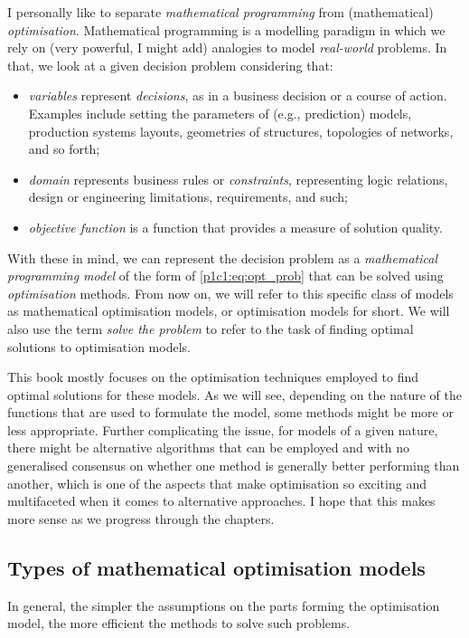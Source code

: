 I personally like to separate \emph{mathematical programming} from (mathematical) \emph{optimisation}. Mathematical programming is a modelling paradigm in which we rely on (very powerful, I might add) analogies to model \emph{real-world} problems. In that, we look at a given decision problem considering that:
%
\begin{itemize}
    \item \emph{variables} represent \emph{decisions}, as in a business decision or a course of action. Examples include setting the parameters of (e.g., prediction) models, production systems layouts, geometries of structures, topologies of networks, and so forth; 
    \item \emph{domain} represents business rules or \emph{constraints}, representing logic relations, design or engineering limitations, requirements, and such; 
    \item \emph{objective function} is a function that provides a measure of solution quality.  
\end{itemize}
%    
With these in mind, we can represent the decision problem as a \emph{mathematical programming model} of the form of \eqref{p1c1:eq:opt_prob} that can be solved using \emph{optimisation} methods. From now on, we will refer to this specific class of models as mathematical optimisation models, or optimisation models for short. We will also use the term \emph{solve the problem} to refer to the task of finding optimal solutions to optimisation models.

This book mostly focuses on the optimisation techniques employed to find optimal solutions for these models. As we will see, depending on the nature of the functions that are used to formulate the model, some methods might be more or less appropriate. Further complicating the issue, for models of a given nature, there might be alternative algorithms that can be employed and with no generalised consensus on whether one method is generally better performing than another, which is one of the aspects that make optimisation so exciting and multifaceted when it comes to alternative approaches. I hope that this makes more sense as we progress through the chapters. 


\subsection{Types of mathematical optimisation models}

In general, the simpler the assumptions on the parts forming the optimisation model, the more efficient the methods to solve such problems. 

